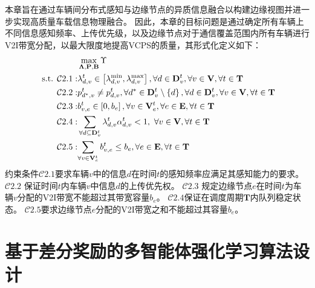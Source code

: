 本章旨在通过车辆间分布式感知与边缘节点的异质信息融合以构建边缘视图并进一步实现高质量车载信息物理融合。
因此，本章的目标问题是通过确定所有车辆上不同信息感知频率、上传优先级，以及边缘节点对于通信覆盖范围内所有车辆进行V2I带宽分配，以最大限度地提高VCPS的质量，其形式化定义如下：
\begin{align}
	&\max_{\bf\Lambda, \mathbf{P}, \mathbf{B}} \Upsilon \notag \\
	\text { s.t. }
    \mathcal{C}2.1: & \lambda_{d,v}^{t} \in \left [\lambda_{d,v}^{\min} , \lambda_{d,v}^{\max} \right ], \forall d \in \mathbf{D}_v^t , \forall v \in \mathbf{V}, \forall t \in \mathbf{T} \notag \\
     \mathcal{C}2.2: &{p}_{d^*, v}^t \neq {p}_{d, v}^t, \forall d^* \in \mathbf{D}_v^t \setminus \left\{ d\right \}, \forall d \in \mathbf{D}_v^t, \forall v \in \mathbf{V}, \forall t \in \mathbf{T} \notag \\
    \mathcal{C}2.3: & b_{v, e}^t \in \left[ 0 , b_e \right ], \forall v \in \mathbf{V}_e^t, \forall e \in \mathbf{E}, \forall t \in \mathbf{T} \notag \\
    \mathcal{C}2.4: & \sum_{\forall d \subseteq \mathbf{D}_v^t} \lambda_{d,v}^{t}  \alpha_{d, v}^t < 1,\ \forall v \in \mathbf{V}, \forall t \in \mathbf{T}  \notag \\
    \mathcal{C}2.5: & {\sum_{\forall v \in \mathbf{V}_e^{t}}b_{v, e}^t} \leq b_e, \forall e \in \mathbf{E}, \forall t \in \mathbf{T}
\end{align}
约束条件$\mathcal{C}2.1$要求车辆$v$中的信息$d$在时间$t$的感知频率应满足其感知能力的要求。
$\mathcal{C}2.2$ 保证时间$t$内车辆$v$中信息$d$的上传优先权。
$\mathcal{C}2.3$ 规定边缘节点$e$在时间$t$为车辆$v$分配的V2I带宽不能超过其带宽容量$b_e$。
$\mathcal{C}2.4$保证在调度周期$\mathbf{T}$内队列稳定状态。
$\mathcal{C}2.5$要求边缘节点$e$分配的V2I带宽之和不能超过其容量$b_e$。

\section{基于差分奖励的多智能体强化学习算法设计}\label{section 2-5}

